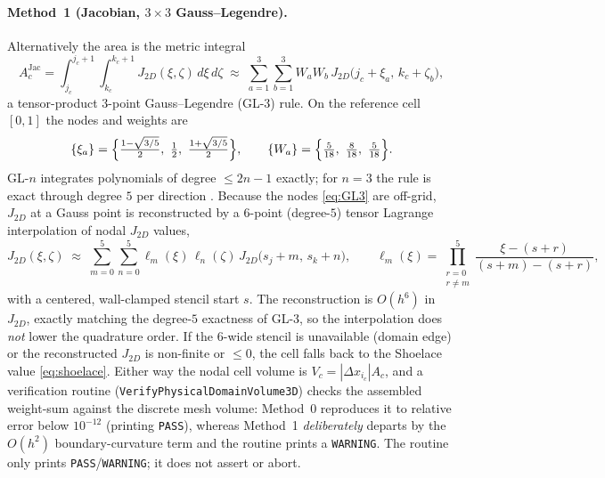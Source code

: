 \documentclass[11pt]{article}
\theoremstyle{definition}
\theoremstyle{remark}
\begin{document}
\paragraph{Method~1 (Jacobian, $3\times3$ Gauss--Legendre).}
Alternatively the area is the metric integral
\begin{equation}
A_c^{\mathrm{Jac}}
=\!\int_{j_c}^{j_c+1}\!\!\int_{k_c}^{k_c+1}\!\! J_{2D}(\xi,\zeta)\,d\xi\,d\zeta
\;\approx\;\sum_{a=1}^{3}\sum_{b=1}^{3} W_a W_b\,
J_{2D}\!\bigl(j_c+\xi_a,\,k_c+\zeta_b\bigr),
\label{eq:Ajac}
\end{equation}
a tensor-product $3$-point Gauss--Legendre (GL-3) rule. On the reference cell
$[0,1]$ the nodes and weights are
\begin{equation}
\{\xi_a\}=\Bigl\{\tfrac{1-\sqrt{3/5}}{2},\ \tfrac12,\ \tfrac{1+\sqrt{3/5}}{2}\Bigr\},
\qquad
\{W_a\}=\Bigl\{\tfrac{5}{18},\ \tfrac{8}{18},\ \tfrac{5}{18}\Bigr\}.
\label{eq:GL3}
\end{equation}
GL-$n$ integrates polynomials of degree $\le 2n{-}1$ exactly; for $n=3$ the rule
is exact through degree $5$ per direction \cite{StoerBulirsch2002,DavisRabinowitz1984}.
Because the nodes \eqref{eq:GL3} are off-grid, $J_{2D}$ at a Gauss point is
reconstructed by a $6$-point (degree-$5$) tensor Lagrange interpolation of nodal
$J_{2D}$ values,
\begin{equation}
J_{2D}(\xi,\zeta)\;\approx\;\sum_{m=0}^{5}\sum_{n=0}^{5}
\ell_m(\xi)\,\ell_n(\zeta)\,J_{2D}\bigl(s_j{+}m,\,s_k{+}n\bigr),
\qquad
\ell_m(\xi)=\!\!\prod_{\substack{r=0\\ r\ne m}}^{5}\frac{\xi-(s+r)}{(s{+}m)-(s{+}r)},
\label{eq:lagrange6}
\end{equation}
with a centered, wall-clamped stencil start $s$. The reconstruction is $O(h^6)$
in $J_{2D}$, exactly matching the degree-$5$ exactness of GL-3, so the
interpolation does \emph{not} lower the quadrature order. If the $6$-wide stencil
is unavailable (domain edge) or the reconstructed $J_{2D}$ is non-finite or
$\le 0$, the cell falls back to the Shoelace value \eqref{eq:shoelace}. Either way
the nodal cell volume is $V_c=|\Delta x_{i_c}|A_c$, and a verification routine
(\texttt{VerifyPhysicalDomainVolume3D}) checks the assembled weight-sum against the
discrete mesh volume: Method~0 reproduces it to relative error below $10^{-12}$
(printing \texttt{PASS}), whereas Method~1 \emph{deliberately} departs by the
$O(h^2)$ boundary-curvature term and the routine prints a \texttt{WARNING}. The
routine only prints \texttt{PASS}/\texttt{WARNING}; it does not assert or abort.
\end{document}
